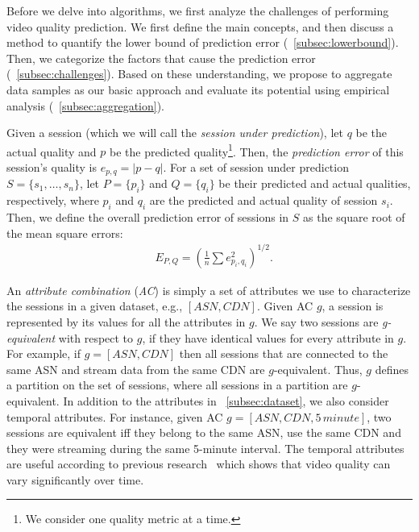 \label{sec:challenges}

Before we delve into algorithms, we first analyze the challenges of
performing video quality prediction. We first define the main
concepts, and then discuss a method to quantify the lower bound of
prediction error (\Section~\ref{subsec:lowerbound}). Then, we
categorize the factors that cause the prediction error
(\Section~\ref{subsec:challenges}). Based on these understanding, we
propose to aggregate data samples as our basic approach and evaluate
its potential using empirical analysis
(\Section~\ref{subsec:aggregation}).

\label{subsec:lowerbound}

Given a session (which we will call the {\it session under
  prediction}), let $q$ be the actual quality and $p$ be the predicted
quality\footnote{We consider one quality metric at a time.}. Then, the
{\it prediction error} of this session's quality is $e_{p,q}=|p-q|$.
For a set of session under prediction $S=\{s_1,\dots,s_n\}$, let
$P=\{p_i\}$ and $Q=\{q_i\}$ be their predicted and actual qualities,
respectively, where $p_i$ and $q_i$ are the predicted and actual
quality of session $s_i$. Then, we define the overall prediction error
of sessions in $S$ as the square root of the mean square errors:
\begin{align}
&E_{P,Q}=\left(\frac{1}{n}\sum e_{p_i,q_i}^2\right)^{1/2}.
\end{align}

 An {\it attribute
  combination} ({\it AC}) is simply a set of attributes we use to
characterize the sessions in a given dataset, e.g., $[ASN,
CDN]$. Given AC $g$, a session is represented by its values for all
the attributes in $g$. We say two sessions are {\it g-equivalent} with
respect to $g$, if they have identical values for every attribute in
$g$. For example, if $g=[ASN,CDN]$ then all sessions that are
connected to the same ASN and stream data from the same CDN are
$g$-equivalent. Thus, $g$ defines a partition on the set of sessions,
where all sessions in a partition are $g$-equivalent. In addition to
the attributes in \Section~\ref{subsec:dataset}, we also consider
temporal attributes. For instance, given AC $g=[ASN, CDN, 5\,minute]$,
two sessions are equivalent iff they belong to the same ASN, use the
same CDN and they were streaming during the same 5-minute
interval. The temporal attributes are useful according to previous
research~\cite{sigcomm12} which shows that video quality can vary
significantly over time.

